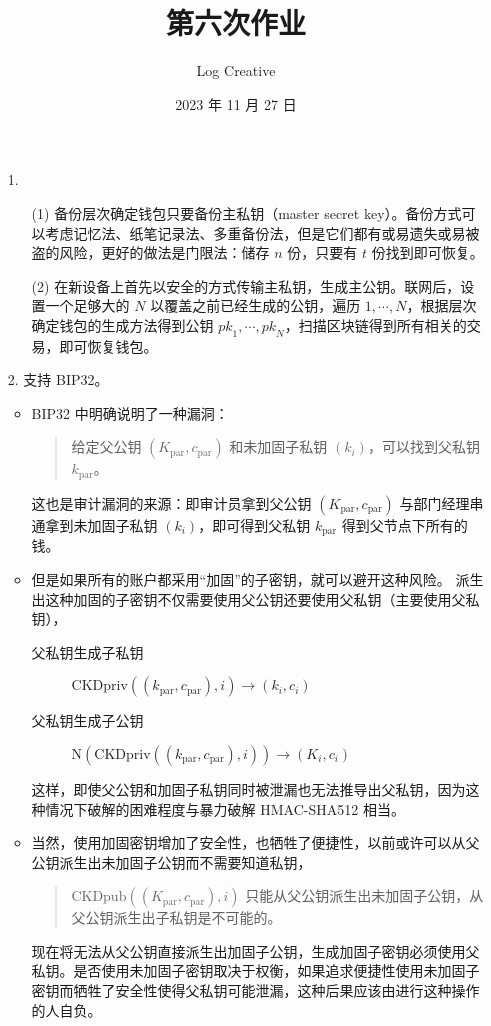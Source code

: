 \documentclass{sjtuarticle}
\title{第六次作业}
\author{Log Creative}
\date{2023 年 11 月 27 日}
\begin{document}
\maketitle
\begin{itemize}
    \item[1.] \begin{itemize}
        \item[(1)] 备份层次确定钱包只要备份主私钥（master secret key）。备份方式可以考虑记忆法、纸笔记录法、多重备份法，但是它们都有或易遗失或易被盗的风险，更好的做法是门限法：储存 $n$ 份，只要有 $t$ 份找到即可恢复。
        \item[(2)] 在新设备上首先以安全的方式传输主私钥，生成主公钥。联网后，设置一个足够大的 $N$ 以覆盖之前已经生成的公钥，遍历 $1,\cdots,N$，根据层次确定钱包的生成方法得到公钥 $\mathit{pk}_1,\cdots,\mathit{pk}_N$，扫描区块链得到所有相关的交易，即可恢复钱包。
    \end{itemize}
    \item[2.] 支持 BIP32。
    
    \begin{itemize}
        \item BIP32 中明确说明了一种漏洞：
        \begin{quotation}
            给定父公钥 $(K_\text{par},c_\text{par})$ 和未加固子私钥 $(k_i)$，可以找到父私钥 $k_\text{par}$。
        \end{quotation}
        这也是审计漏洞的来源：即审计员拿到父公钥 $(K_\text{par},c_\text{par})$ 与部门经理串通拿到未加固子私钥 $(k_i)$，即可得到父私钥 $k_\text{par}$ 得到父节点下所有的钱。
        \item 但是如果所有的账户都采用“加固”的子密钥，就可以避开这种风险。
        派生出这种加固的子密钥不仅需要使用父公钥还要使用父私钥（主要使用父私钥），
        \begin{description}
            \item[父私钥生成子私钥] $\text{CKDpriv}((k_\text{par},c_\text{par}), i)\rightarrow (k_i,c_i)$
            \item[父私钥生成子公钥] $\text{N}(\text{CKDpriv}((k_\text{par},c_\text{par}), i))\rightarrow (K_i,c_i)$
        \end{description}
        这样，即使父公钥和加固子私钥同时被泄漏也无法推导出父私钥，因为这种情况下破解的困难程度与暴力破解 HMAC-SHA512 相当。
        \item 当然，使用加固密钥增加了安全性，也牺牲了便捷性，以前或许可以从父公钥派生出未加固子公钥而不需要知道私钥，
        \begin{quotation}
            $\text{CKDpub}((K_\text{par},c_\text{par}),i)$ 只能从父公钥派生出未加固子公钥，从父公钥派生出子私钥是不可能的。
        \end{quotation}
        现在将无法从父公钥直接派生出加固子公钥，生成加固子密钥必须使用父私钥。是否使用未加固子密钥取决于权衡，如果追求便捷性使用未加固子密钥而牺牲了安全性使得父私钥可能泄漏，这种后果应该由进行这种操作的人自负。    
    \end{itemize}
\end{itemize}
\end{document}
